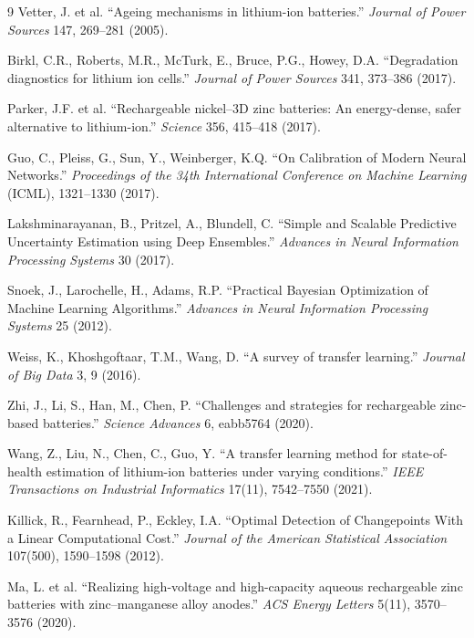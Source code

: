 \documentclass[12pt]{article}
\begin{document}
\begin{thebibliography}{9}
Vetter, J. et al.
``Ageing mechanisms in lithium-ion batteries.''
\textit{Journal of Power Sources} 147, 269--281 (2005).

Birkl, C.R., Roberts, M.R., McTurk, E., Bruce, P.G., Howey, D.A.
``Degradation diagnostics for lithium ion cells.''
\textit{Journal of Power Sources} 341, 373--386 (2017).

Parker, J.F. et al.
``Rechargeable nickel--3D zinc batteries: An energy-dense, safer alternative to lithium-ion.''
\textit{Science} 356, 415--418 (2017).

Guo, C., Pleiss, G., Sun, Y., Weinberger, K.Q.
``On Calibration of Modern Neural Networks.''
\textit{Proceedings of the 34th International Conference on Machine Learning} (ICML), 1321--1330 (2017).

Lakshminarayanan, B., Pritzel, A., Blundell, C.
``Simple and Scalable Predictive Uncertainty Estimation using Deep Ensembles.''
\textit{Advances in Neural Information Processing Systems} 30 (2017).

Snoek, J., Larochelle, H., Adams, R.P.
``Practical Bayesian Optimization of Machine Learning Algorithms.''
\textit{Advances in Neural Information Processing Systems} 25 (2012).

Weiss, K., Khoshgoftaar, T.M., Wang, D.
``A survey of transfer learning.''
\textit{Journal of Big Data} 3, 9 (2016).

Zhi, J., Li, S., Han, M., Chen, P.
``Challenges and strategies for rechargeable zinc-based batteries.''
\textit{Science Advances} 6, eabb5764 (2020).

Wang, Z., Liu, N., Chen, C., Guo, Y.
``A transfer learning method for state-of-health estimation of lithium-ion batteries under varying conditions.''
\textit{IEEE Transactions on Industrial Informatics} 17(11), 7542--7550 (2021).

Killick, R., Fearnhead, P., Eckley, I.A.
``Optimal Detection of Changepoints With a Linear Computational Cost.''
\textit{Journal of the American Statistical Association} 107(500), 1590--1598 (2012).

Ma, L. et al.
``Realizing high-voltage and high-capacity aqueous rechargeable zinc batteries with zinc--manganese alloy anodes.''
\textit{ACS Energy Letters} 5(11), 3570--3576 (2020).

\end{thebibliography}
\end{document}
